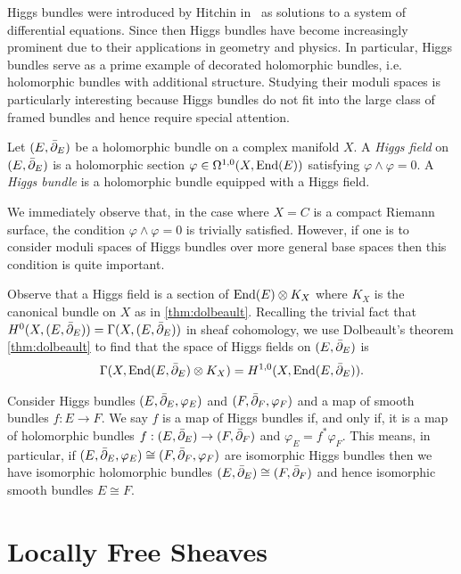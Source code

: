 \documentclass[12pt]{ociamthesis}  %
\begin{document}
Higgs bundles were introduced by Hitchin in~\cite{hitchin1987}
as solutions to a system of differential equations. Since then
Higgs bundles have become increasingly prominent due to their applications
in geometry and physics. In particular, Higgs bundles serve as a
prime example of decorated holomorphic bundles, i.e. holomorphic bundles
with additional structure. Studying their moduli spaces is particularly
interesting because Higgs bundles do not fit into the large class of framed
bundles and hence require special attention.~\cite[Example 4.B.3]{huybrechts2010}

\begin{definition}
  Let $(E,{\bar{\partial}}_E)$ be a holomorphic bundle on a complex manifold $X$.
  A \emph{Higgs field} on $(E,{\bar{\partial}}_E)$ is a holomorphic section
  $\varphi \in \Omega^{1,0}(X,\operatorname{End}(E))$ satisfying $\varphi\wedge\varphi = 0$.
  A \emph{Higgs bundle} is a holomorphic bundle equipped with
  a Higgs field.
\end{definition}
We immediately observe that, in the case where $X=C$ is a compact
Riemann surface, the condition $\varphi\wedge\varphi=0$ is trivially
satisfied. However, if one is to consider moduli spaces of Higgs bundles
over more general base spaces then this condition is quite important.

Observe that a Higgs field is a section of $\operatorname{End}(E) \otimes K_X$
where $K_X$ is the canonical bundle on $X$ as in \ref{thm:dolbeault}.
Recalling the trivial fact that $H^0(X,(E,{\bar{\partial}}_E))=\Gamma(X,(E,{\bar{\partial}}_E))$
in sheaf cohomology, we use Dolbeault's theorem \ref{thm:dolbeault} to
find that the space of Higgs fields on $(E,{\bar{\partial}}_E)$ is
\begin{align*}
  \Gamma(X,\operatorname{End}(E,{\bar{\partial}}_E)\otimes K_X) = H^{1,0}(X,\operatorname{End}(E,{\bar{\partial}}_E)).
\end{align*}

Consider Higgs bundles $(E,{\bar{\partial}}_E,\varphi_E)$ and $(F,{\bar{\partial}}_F,\varphi_F)$
and a map of smooth bundles $f:E\to F$. We say $f$ is a map of Higgs
bundles if, and only if, it is a map of holomorphic bundles
$f:(E,{\bar{\partial}}_E)\to (F,{\bar{\partial}}_F)$ and $\varphi_E = f^*\varphi_F$.
This means, in particular, if $(E,{\bar{\partial}}_E,\varphi_E)\cong(F,{\bar{\partial}}_F,\varphi_F)$
are isomorphic Higgs bundles then we have isomorphic holomorphic bundles
$(E,{\bar{\partial}}_E)\cong(F,{\bar{\partial}}_F)$ and hence isomorphic smooth bundles
$E\cong F$.

\section{Locally Free Sheaves}
\end{document}
